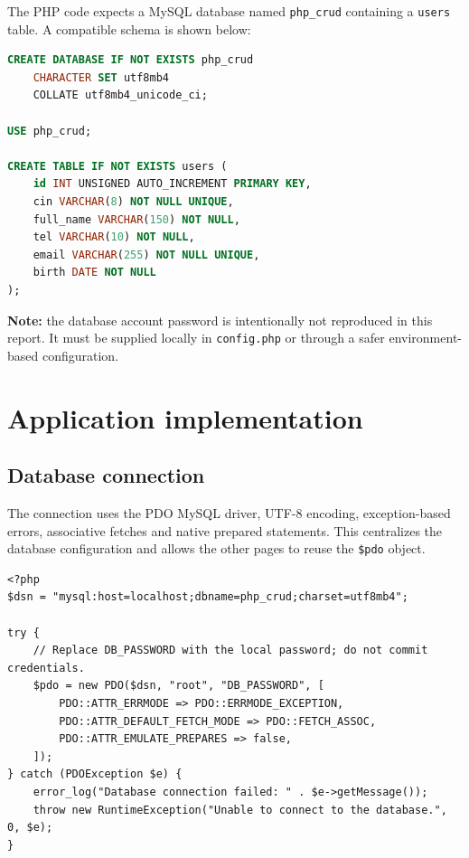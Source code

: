 \documentclass[12pt,a4paper]{article}
\begin{document}
The PHP code expects a MySQL database named \texttt{php\_crud} containing a
\texttt{users} table. A compatible schema is shown below:

\begin{lstlisting}[language=SQL,caption={SQL schema for the users table}]
CREATE DATABASE IF NOT EXISTS php_crud
    CHARACTER SET utf8mb4
    COLLATE utf8mb4_unicode_ci;

USE php_crud;

CREATE TABLE IF NOT EXISTS users (
    id INT UNSIGNED AUTO_INCREMENT PRIMARY KEY,
    cin VARCHAR(8) NOT NULL UNIQUE,
    full_name VARCHAR(150) NOT NULL,
    tel VARCHAR(10) NOT NULL,
    email VARCHAR(255) NOT NULL UNIQUE,
    birth DATE NOT NULL
);
\end{lstlisting}

\textbf{Note:} the database account password is intentionally not reproduced
in this report. It must be supplied locally in \texttt{config.php} or through
a safer environment-based configuration.

\section{Application implementation}

\subsection{Database connection}

The connection uses the PDO MySQL driver, UTF-8 encoding, exception-based
errors, associative fetches and native prepared statements. This centralizes
the database configuration and allows the other pages to reuse the
\texttt{\$pdo} object.

\begin{lstlisting}[caption={Documented version of config.php}]
<?php
$dsn = "mysql:host=localhost;dbname=php_crud;charset=utf8mb4";

try {
    // Replace DB_PASSWORD with the local password; do not commit credentials.
    $pdo = new PDO($dsn, "root", "DB_PASSWORD", [
        PDO::ATTR_ERRMODE => PDO::ERRMODE_EXCEPTION,
        PDO::ATTR_DEFAULT_FETCH_MODE => PDO::FETCH_ASSOC,
        PDO::ATTR_EMULATE_PREPARES => false,
    ]);
} catch (PDOException $e) {
    error_log("Database connection failed: " . $e->getMessage());
    throw new RuntimeException("Unable to connect to the database.", 0, $e);
}
\end{lstlisting}
\end{document}
